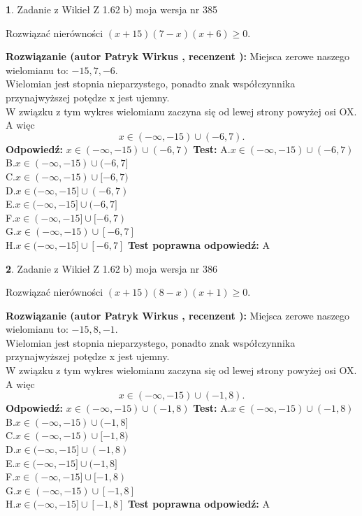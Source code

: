 \documentclass[12pt, a4paper]{article}
\theoremstyle{definition} %
\newtheorem{zad}{}
\newcommand{\zadStart}[1]{\begin{zad}#1\newline}
\newcommand{\zadStop}{\end{zad}}
\newcommand{\rozwStart}[2]{\noindent \textbf{Rozwiązanie (autor #1 , recenzent #2): }\newline}
\newcommand{\rozwStop}{\newline}
\newcommand{\odpStart}{\noindent \textbf{Odpowiedź:}\newline}
\newcommand{\odpStop}{\newline}
\newcommand{\testStart}{\noindent \textbf{Test:}\newline}
\newcommand{\testStop}{\newline}
\newcommand{\kluczStart}{\noindent \textbf{Test poprawna odpowiedź:}\newline}
\newcommand{\kluczStop}{\newline}
\begin{document}
\zadStart{Zadanie z Wikieł Z 1.62 b) moja wersja nr 385}

Rozwiązać nierówności $(x+15)(7-x)(x+6)\ge0$.
\zadStop
\rozwStart{Patryk Wirkus}{}
Miejsca zerowe naszego wielomianu to: $-15, 7, -6$.\\
Wielomian jest stopnia nieparzystego, ponadto znak współczynnika przy\linebreak najwyższej potędze x jest ujemny.\\ W związku z tym wykres wielomianu zaczyna się od lewej strony powyżej osi OX. A więc $$x \in (-\infty,-15) \cup (-6,7).$$
\rozwStop
\odpStart
$x \in (-\infty,-15) \cup (-6,7)$
\odpStop
\testStart
A.$x \in (-\infty,-15) \cup (-6,7)$\\
B.$x \in (-\infty,-15) \cup (-6,7]$\\
C.$x \in (-\infty,-15) \cup [-6,7)$\\
D.$x \in (-\infty,-15] \cup (-6,7)$\\
E.$x \in (-\infty,-15] \cup (-6,7]$\\
F.$x \in (-\infty,-15] \cup [-6,7)$\\
G.$x \in (-\infty,-15) \cup [-6,7]$\\
H.$x \in (-\infty,-15] \cup [-6,7]$
\testStop
\kluczStart
A
\kluczStop



\zadStart{Zadanie z Wikieł Z 1.62 b) moja wersja nr 386}

Rozwiązać nierówności $(x+15)(8-x)(x+1)\ge0$.
\zadStop
\rozwStart{Patryk Wirkus}{}
Miejsca zerowe naszego wielomianu to: $-15, 8, -1$.\\
Wielomian jest stopnia nieparzystego, ponadto znak współczynnika przy\linebreak najwyższej potędze x jest ujemny.\\ W związku z tym wykres wielomianu zaczyna się od lewej strony powyżej osi OX. A więc $$x \in (-\infty,-15) \cup (-1,8).$$
\rozwStop
\odpStart
$x \in (-\infty,-15) \cup (-1,8)$
\odpStop
\testStart
A.$x \in (-\infty,-15) \cup (-1,8)$\\
B.$x \in (-\infty,-15) \cup (-1,8]$\\
C.$x \in (-\infty,-15) \cup [-1,8)$\\
D.$x \in (-\infty,-15] \cup (-1,8)$\\
E.$x \in (-\infty,-15] \cup (-1,8]$\\
F.$x \in (-\infty,-15] \cup [-1,8)$\\
G.$x \in (-\infty,-15) \cup [-1,8]$\\
H.$x \in (-\infty,-15] \cup [-1,8]$
\testStop
\kluczStart
A
\kluczStop
\end{document}
